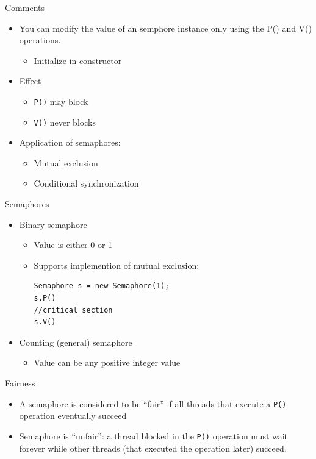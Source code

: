 \begin{frame}{Comments}
  \begin{itemize}
  \item You can modify the value of an semphore instance only using the P() and V() operations.
    \begin{itemize}
    \item Initialize in constructor
    \end{itemize}
  \item Effect
    \begin{itemize}
    \item \lstinline!P()! may block 
    \item \lstinline!V()! never blocks
    \end{itemize}
  \item Application of semaphores:
    \begin{itemize}
    \item Mutual exclusion
    \item Conditional synchronization
    \end{itemize}
  \end{itemize}
\end{frame}

\begin{frame}[fragile]{Semaphores}
  \begin{itemize}
  \item Binary  semaphore
    \begin{itemize}
    \item Value is either 0 or 1
    \item Supports implemention of  mutual exclusion:
\begin{lstlisting}
Semaphore s = new Semaphore(1);
s.P()
//critical section
s.V()
\end{lstlisting}
    \end{itemize}
  \item Counting (general) semaphore
    \begin{itemize}
    \item Value can be any positive integer value
    \end{itemize}
  \end{itemize}
\end{frame}

\begin{frame}{Fairness}
  \begin{itemize}
  \item A semaphore is considered to be ``fair'' if all threads that
    execute a \lstinline!P()! operation eventually succeed
  \item Semaphore is ``unfair'': a thread blocked in the
    \lstinline!P()! operation must wait forever while other threads
    (that executed the operation later) succeed.
  \end{itemize}
\end{frame}

